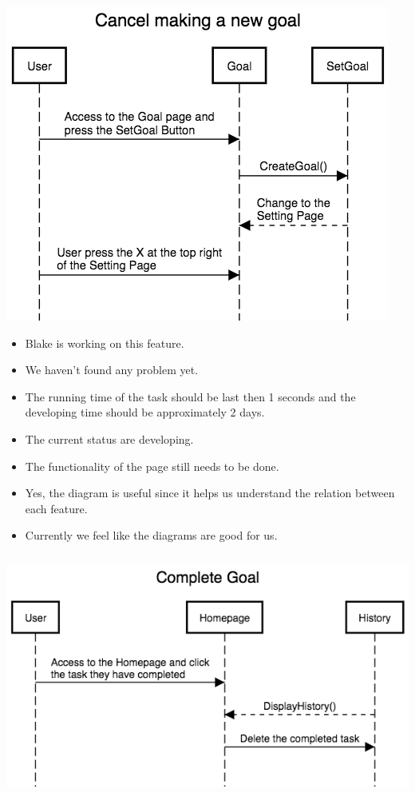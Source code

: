 \documentclass[a4paper]{article}
\begin{document}
\includegraphics[width=\textwidth]{Cancel_making_a_new_goal.png}
\begin{itemize}
	\item Blake is working on this feature. 
	\item We haven't found any problem yet.
    \item The running time of the task should be last then 1 seconds and the developing time should be approximately 2 days.
    \item The current status are developing.
  \item The functionality of the page still needs to be done.
  \item Yes, the diagram is useful since it helps us understand the relation between each feature.
  \item Currently we feel like the diagrams are good for us.
\end{itemize}
\includegraphics[width=\textwidth, height=8cm]{Complete_Goal.png}
\end{document}
